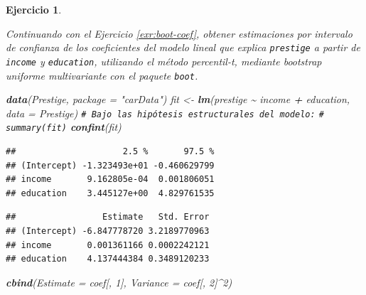 \documentclass[
]{book}
\newenvironment{Shaded}{\begin{snugshade}}{\end{snugshade}}
\newcommand{\AttributeTok}[1]{\textcolor[rgb]{0.13,0.29,0.53}{#1}}
\newcommand{\CommentTok}[1]{\textcolor[rgb]{0.56,0.35,0.01}{\textit{#1}}}
\newcommand{\DecValTok}[1]{\textcolor[rgb]{0.00,0.00,0.81}{#1}}
\newcommand{\FunctionTok}[1]{\textcolor[rgb]{0.13,0.29,0.53}{\textbf{#1}}}
\newcommand{\NormalTok}[1]{#1}
\newcommand{\OtherTok}[1]{\textcolor[rgb]{0.56,0.35,0.01}{#1}}
\newcommand{\SpecialCharTok}[1]{\textcolor[rgb]{0.81,0.36,0.00}{\textbf{#1}}}
\newcommand{\StringTok}[1]{\textcolor[rgb]{0.31,0.60,0.02}{#1}}
\theoremstyle{break}
\newtheorem{exercise}{Ejercicio}[chapter]
\theoremstyle{nonumberplain}
\renewcommand{\CommentTok}[1]{\textcolor[rgb]{0.41,0.41,0.41}{\texttt{#1}}}
\begin{document}
\begin{exercise}
\protect\hypertarget{exr:boot-coef-stud}{}\label{exr:boot-coef-stud}

Continuando con el Ejercicio \ref{exr:boot-coef}, obtener estimaciones por intervalo de confianza de los coeficientes del modelo lineal que explica \texttt{prestige} a partir de \texttt{income} y \texttt{education}, utilizando el método percentil-\emph{t}, mediante bootstrap uniforme multivariante con el paquete \texttt{boot}.

\begin{Shaded}
\begin{Highlighting}[]
\FunctionTok{data}\NormalTok{(Prestige, }\AttributeTok{package =} \StringTok{"carData"}\NormalTok{)}
\NormalTok{fit }\OtherTok{\textless{}{-}} \FunctionTok{lm}\NormalTok{(prestige }\SpecialCharTok{\textasciitilde{}}\NormalTok{ income }\SpecialCharTok{+}\NormalTok{ education, }\AttributeTok{data =}\NormalTok{ Prestige)}
\CommentTok{\# Bajo las hipótesis estructurales del modelo:}
\CommentTok{\# summary(fit)}
\FunctionTok{confint}\NormalTok{(fit)}
\end{Highlighting}
\end{Shaded}

\begin{verbatim}
##                     2.5 %       97.5 %
## (Intercept) -1.323493e+01 -0.460629799
## income       9.162805e-04  0.001806051
## education    3.445127e+00  4.829761535
\end{verbatim}

\begin{Shaded}
\end{Shaded}

\begin{verbatim}
##                 Estimate   Std. Error
## (Intercept) -6.847778720 3.2189770963
## income       0.001361166 0.0002242121
## education    4.137444384 0.3489120233
\end{verbatim}

\begin{Shaded}
\begin{Highlighting}[]
\FunctionTok{cbind}\NormalTok{(}\AttributeTok{Estimate =}\NormalTok{ coef[, }\DecValTok{1}\NormalTok{], }\AttributeTok{Variance =}\NormalTok{ coef[, }\DecValTok{2}\NormalTok{]}\SpecialCharTok{\^{}}\DecValTok{2}\NormalTok{)}
\end{Highlighting}
\end{Shaded}


\end{exercise}
\end{document}
